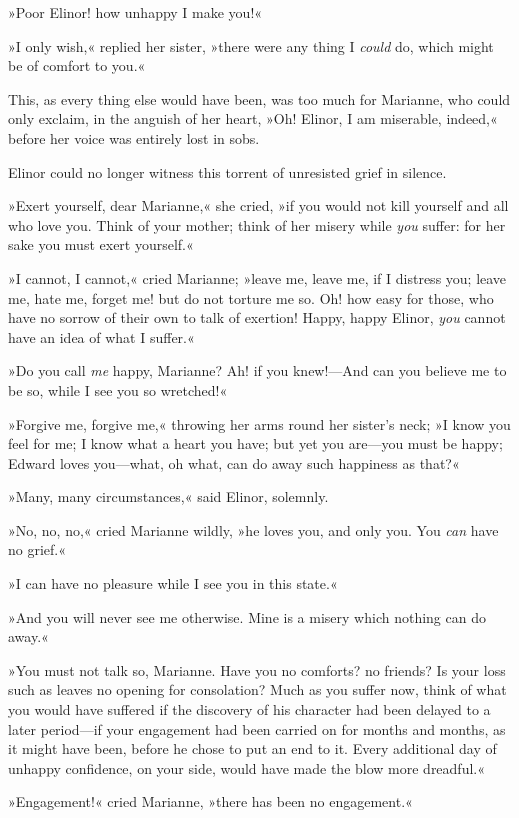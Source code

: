 »Poor Elinor! how unhappy I make you!«

»I only wish,« replied her sister, »there were any thing I \textit{could} do, which might be of comfort to you.«

This, as every thing else would have been, was too much for Marianne, who could only exclaim, in the anguish of her heart, »Oh! Elinor, I am miserable, indeed,« before her voice was entirely lost in sobs.

Elinor could no longer witness this torrent of unresisted grief in silence.

»Exert yourself, dear Marianne,« she cried, »if you would not kill yourself and all who love you. Think of your mother; think of her misery while \textit{you} suffer: for her sake you must exert yourself.«

»I cannot, I cannot,« cried Marianne; »leave me, leave me, if I distress you; leave me, hate me, forget me! but do not torture me so. Oh! how easy for those, who have no sorrow of their own to talk of exertion! Happy, happy Elinor, \textit{you} cannot have an idea of what I suffer.«

»Do you call \textit{me} happy, Marianne? Ah! if you knew!—And can you believe me to be so, while I see you so wretched!«

»Forgive me, forgive me,« throwing her arms round her sister’s neck; »I know you feel for me; I know what a heart you have; but yet you are—you must be happy; Edward loves you—what, oh what, can do away such happiness as that?«

»Many, many circumstances,« said Elinor, solemnly.

»No, no, no,« cried Marianne wildly, »he loves you, and only you. You \textit{can} have no grief.«

»I can have no pleasure while I see you in this state.«

»And you will never see me otherwise. Mine is a misery which nothing can do away.«

»You must not talk so, Marianne. Have you no comforts? no friends? Is your loss such as leaves no opening for consolation? Much as you suffer now, think of what you would have suffered if the discovery of his character had been delayed to a later period—if your engagement had been carried on for months and months, as it might have been, before he chose to put an end to it. Every additional day of unhappy confidence, on your side, would have made the blow more dreadful.«

»Engagement!« cried Marianne, »there has been no engagement.«


